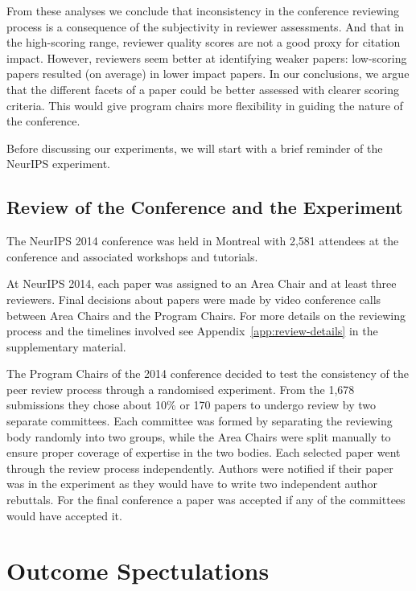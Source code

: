 \documentclass[twoside]{article}
\begin{document}
From these analyses we conclude that inconsistency in the conference
reviewing process is a consequence of the subjectivity in reviewer
assessments. And that in the high-scoring range, reviewer quality
scores are not a good proxy for citation impact. However, reviewers
seem better at identifying weaker papers: low-scoring papers resulted (on
average) in lower impact papers. In our conclusions, we argue that the different
facets of a paper could be better assessed with clearer scoring
criteria. This would give program chairs more flexibility in guiding
the nature of the conference.

Before discussing our experiments, we will start with a brief
reminder of the NeurIPS experiment.

\hypertarget{review-of-the-conference-and-the-experiment}{%
\subsection{Review of the Conference and the
Experiment}\label{review-of-the-conference-and-the-experiment}}
The NeurIPS 2014 conference was held in Montreal with 2,581 attendees at the
conference and associated workshops and tutorials. 

At NeurIPS 2014, each paper was assigned to an Area Chair and at least
three reviewers. Final decisions about papers were made by video
conference calls between Area Chairs and the Program Chairs. For more details
on the reviewing process and the timelines involved see
Appendix~\ref{app:review-details} in the supplementary material. 

The Program Chairs of the 2014 conference decided to test the
consistency of the peer review process through a randomised experiment.
From the 1,678 submissions they chose about 10\% or 170 papers to undergo review by
two separate committees. Each committee was formed by separating the
reviewing body randomly into two groups, while the Area Chairs were
split manually to ensure proper coverage of expertise in the two bodies.
Each selected paper went through the review process
independently. Authors were notified if their paper was in the
experiment as they would have to write two independent author
rebuttals. For the final conference a paper was accepted if any of the
committees would have accepted it. 

\section{Outcome Spectulations}
\end{document}
